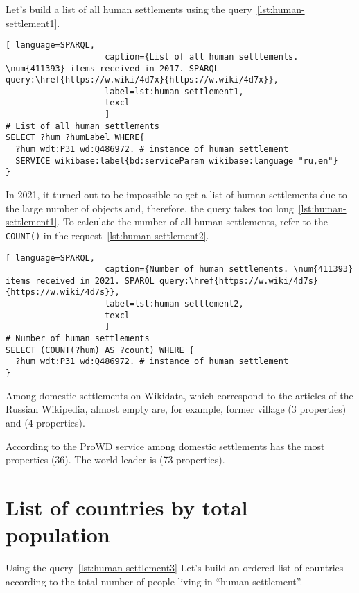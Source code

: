 Let's build a list of all human settlements using the query~\ref{lst:human-settlement1}.

\begin{lstlisting}[ language=SPARQL, 
                    caption={List of all human settlements. \num{411393} items received in 2017. SPARQL query:\href{https://w.wiki/4d7x}{https://w.wiki/4d7x}},
                    label=lst:human-settlement1,
                    texcl 
                    ]
# List of all human settlements
SELECT ?hum ?humLabel WHERE{
  ?hum wdt:P31 wd:Q486972. # instance of human settlement
  SERVICE wikibase:label{bd:serviceParam wikibase:language "ru,en"}
}
\end{lstlisting}%

In 2021, it turned out to be impossible to get a list of human settlements
due to the large number of objects and, therefore, the query takes too long~\ref{lst:human-settlement1}.
To calculate the number of all human settlements, refer to the \lstinline|COUNT()|
in the request~\ref{lst:human-settlement2}.

\begin{lstlisting}[ language=SPARQL, 
                    caption={Number of human settlements. \num{411393} items received in 2021. SPARQL query:\href{https://w.wiki/4d7s}{https://w.wiki/4d7s}},
                    label=lst:human-settlement2,
                    texcl 
                    ]
# Number of human settlements
SELECT (COUNT(?hum) AS ?count) WHERE {
  ?hum wdt:P31 wd:Q486972. # instance of human settlement  
}
\end{lstlisting}%

Among domestic settlements on Wikidata,
which correspond to the articles of the Russian Wikipedia,
almost empty are, for example,
former village  (3 properties)
and  (4 properties).

According to the ProWD service
among domestic settlements
 has the most properties (36).
The world leader is  (73 properties).

\section{List of countries by total population}

Using the query~\ref{lst:human-settlement3}
Let's build an ordered list of countries according to the total number of people living in ``human settlement''.

